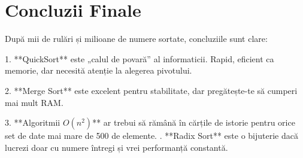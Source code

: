 \documentclass[12pt, a4paper]{article}
\begin{document}
\section{Concluzii Finale}
După mii de rulări și milioane de numere sortate, concluziile sunt clare:

1. **QuickSort** este „calul de povară” al informaticii. Rapid, eficient ca memorie, dar necesită atenție la alegerea pivotului.

2. **Merge Sort** este excelent pentru stabilitate, dar pregătește-te să cumperi mai mult RAM.

3. **Algoritmii $O(n^2)$** ar trebui să rămână în cărțile de istorie pentru orice set de date mai mare de 500 de elemente.
. **Radix Sort** este o bijuterie dacă lucrezi doar cu numere întregi și vrei performanță constantă.



\end{document}
